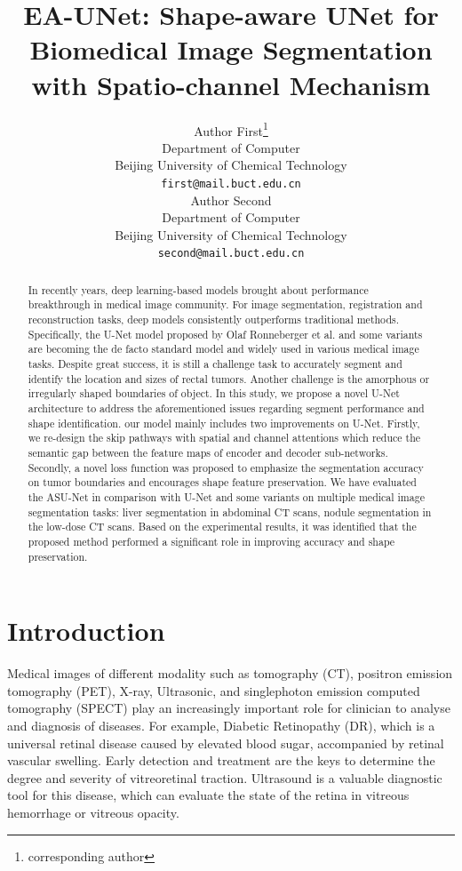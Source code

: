 \documentclass[UTF8]{article} %
\title{EA-UNet: Shape-aware UNet for Biomedical Image Segmentation with Spatio-channel Mechanism}
\author{%
  Author First\thanks{corresponding author} \\
  Department of Computer \\
  Beijing University of Chemical Technology \\  
  \texttt{first@mail.buct.edu.cn} \\
  \And
  Author Second\\
  Department of Computer \\
  Beijing University of Chemical Technology \\
  \texttt{second@mail.buct.edu.cn} 
}
\begin{document}
\maketitle

\begin{abstract}
In recently years, deep learning-based models brought about performance breakthrough  in medical image community. For image segmentation, registration and reconstruction tasks, deep models consistently outperforms traditional methods. Specifically, the U-Net model proposed by Olaf Ronneberger et al.\cite{RonnebergerFB15} and some variants are becoming the de facto standard model and widely used in various medical image tasks. Despite great success, it is still a challenge task to accurately segment and identify the location and sizes of rectal tumors. Another challenge is the amorphous or irregularly shaped boundaries of object. In this study, we propose a novel U-Net architecture to address the aforementioned issues regarding segment performance and shape identification. our model mainly includes two improvements on U-Net. Firstly, we re-design the skip pathways with spatial and channel attentions which reduce the semantic gap between the feature maps of encoder and decoder sub-networks. Secondly, a novel loss function was proposed to emphasize the segmentation accuracy on tumor boundaries and encourages shape feature preservation. We have evaluated the ASU-Net in comparison with U-Net and some variants on multiple medical image segmentation tasks: liver segmentation in abdominal CT scans, nodule segmentation in the low-dose CT scans. Based on the experimental results, it was identified that the proposed method performed a significant role in improving accuracy and shape preservation.
\end{abstract}

\section{Introduction}
Medical images of different modality such as tomography (CT), positron emission tomography (PET), X-ray, Ultrasonic, and singlephoton emission computed tomography (SPECT) play an increasingly important role for clinician to analyse and diagnosis of diseases. For example, Diabetic Retinopathy (DR), which  is a universal retinal disease caused by elevated blood sugar, accompanied by retinal vascular swelling. Early detection and treatment are the keys to determine the degree and severity of vitreoretinal traction. Ultrasound is a valuable diagnostic tool for this disease, which can evaluate the state of the retina in vitreous hemorrhage or vitreous opacity.
\end{document}
